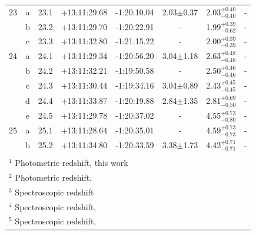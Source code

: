 \documentclass[useAMS,usenatbib]{mn2e}
\begin{document}
\begin{table}
\begin{tabular}{cccccccc}
     \hline							    		    	    				
       23 & a & 23.1 & +13:11:29.68 & -1:20:10.04 & 2.03$\pm$0.37 & 2.03$^{+0.40}_{-0.40}$ &       -      \\
          & b & 23.2 & +13:11:29.70 & -1:20:22.91 &      -        & 1.99$^{+0.39}_{-0.62}$ &       -      \\
          & c & 23.3 & +13:11:32.80 & -1:21:15.22 &      -        & 2.00$^{+0.39}_{-0.39}$ &       -      \\
     \hline							    		    	    				
       24 & a & 24.1 & +13:11:29.34 & -1:20:56.20 & 3.04$\pm$1.18 & 2.63$^{+0.48}_{-0.48}$ &       -      \\
          & b & 24.2 & +13:11:32.21 & -1:19:50.58 &      -        & 2.50$^{+0.46}_{-0.46}$ &       -      \\
          & c & 24.3 & +13:11:30.44 & -1:19:34.16 & 3.04$\pm$0.89 & 2.43$^{+0.45}_{-0.45}$ &       -      \\
          & d & 24.4 & +13:11:33.87 & -1:20:19.88 & 2.84$\pm$1.35 & 2.81$^{+0.69}_{-0.50}$ &       -      \\
          & e & 24.5 & +13:11:29.78 & -1:20:37.02 &      -        & 4.55$^{+0.73}_{-0.80}$ &       -      \\
     \hline							    		    	    				
       25 & a & 25.1 & +13:11:28.64 & -1:20:35.01 &      -        & 4.59$^{+0.73}_{-0.73}$ &       -      \\
          & b & 25.2 & +13:11:34.80 & -1:20:33.59 & 3.38$\pm$1.73 & 4.42$^{+0.71}_{-0.71}$ &       -      \\
    \hline\\
    \multicolumn{7}{l}{$^1$ Photometric redshift, this work}\\
    \multicolumn{7}{l}{$^2$ Photometric redshift, \citealt{broadhurst:05}}\\
    \multicolumn{7}{l}{$^3$ Spectroscopic redshift}\\
    \multicolumn{7}{l}{$^4$ Spectroscopic redshift, \citealt{golse:phd}}\\
    \multicolumn{7}{l}{$^5$ Spectroscopic redshift, \citealt{broadhurst:05}}\\
  \end{tabular}
  \label{tab:app:details2}
\end{table}
\end{document}
